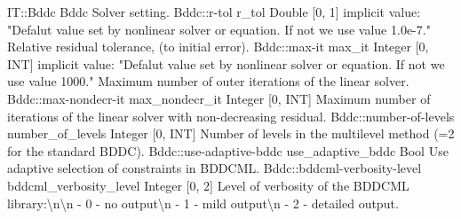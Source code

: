 \begin{RecordType}
	{IT::Bddc}
	{Bddc}
	{}%
	{}%
	{{{Solver setting.}%
}}
		\RecKey
			{Bddc::r-tol}
			{r{\_}tol}
			{{Double [0, 1]}}{}
			{implicit value: "{Defalut value set by nonlinear solver or equation. If not we use value 1.0e-7.}"}
			{{{Relative residual tolerance,  (to initial error).}%
}}
		\RecKey
			{Bddc::max-it}
			{max{\_}it}
			{{Integer [0, INT]}}{}
			{implicit value: "{Defalut value set by nonlinear solver or equation. If not we use value 1000.}"}
			{{{Maximum number of outer iterations of the linear solver.}%
}}
		\RecKey
			{Bddc::max-nondecr-it}
			{max{\_}nondecr{\_}it}
			{{Integer [0, INT]}}{}
			{ }
			{{{Maximum number of iterations of the linear solver with non-decreasing residual.}%
}}
		\RecKey
			{Bddc::number-of-levels}
			{number{\_}of{\_}levels}
			{{Integer [0, INT]}}{}
			{ }
			{{{Number of levels in the multilevel method (=2 for the standard BDDC).}%
}}
		\RecKey
			{Bddc::use-adaptive-bddc}
			{use{\_}adaptive{\_}bddc}
			{{Bool}}{}
			{ }
			{{{Use adaptive selection of constraints in BDDCML.}%
}}
		\RecKey
			{Bddc::bddcml-verbosity-level}
			{bddcml{\_}verbosity{\_}level}
			{{Integer [0, 2]}}{}
			{ }
			{{{Level of verbosity of the BDDCML library:{\textbackslash}n{\textbackslash}n - 0 - no output{\textbackslash}n - 1 - mild output{\textbackslash}n - 2 - detailed output.}%
}}
\end{RecordType}
